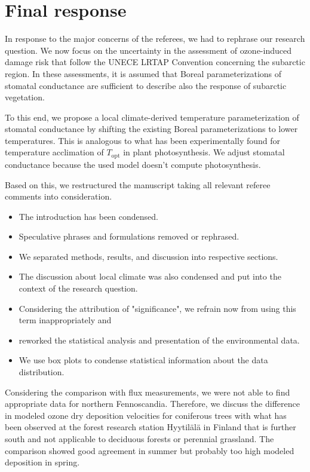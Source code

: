 \documentclass{scrartcl}
\begin{document}
\section{Final response}
In response to the major concerns of the referees, we had to rephrase our research question. We now focus on the uncertainty in the assessment of ozone-induced damage risk that follow the UNECE LRTAP Convention concerning the subarctic region. In these assessments, it is assumed that Boreal parameterizations of stomatal conductance are sufficient to describe also the response of subarctic vegetation.

To this end, we propose a local climate-derived temperature parameterization of stomatal conductance by shifting the existing Boreal parameterizations to lower temperatures. This is analogous to what has been experimentally found for temperature acclimation of $T_\mathrm{opt}$ in plant photosynthesis. We adjust stomatal conductance because the used model doesn't compute photosynthesis.

Based on this, we restructured the manuscript taking all relevant referee comments into consideration. 
\begin{itemize}
    \item The introduction has been condensed.
    \item Speculative phrases and formulations removed or rephrased.
    \item We separated methods, results, and discussion into respective sections.
    \item The discussion about local climate was also condensed and put into the context of the research question.
    \item Considering the attribution of "significance", we refrain now from using this term inappropriately and
    \item reworked the statistical analysis and presentation of the environmental data.
    \item We use box plots to condense statistical information about the data distribution.
\end{itemize}
      
Considering the comparison with flux measurements, we were not able to find appropriate data for northern Fennoscandia. Therefore, we discuss the difference in modeled ozone dry deposition velocities for coniferous trees with what has been observed at the forest research station Hyytilälä in Finland that is further south and not applicable to deciduous forests or perennial grassland. The comparison showed good agreement in summer but probably too high modeled deposition in spring.
\end{document}

